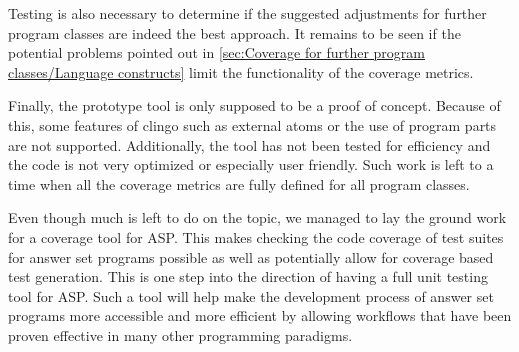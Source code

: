 Testing is also necessary to determine if the suggested adjustments for further program classes are indeed the best approach. It remains to be seen if the potential problems pointed out in \cref{sec:Coverage for further program classes/Language constructs} limit the functionality of the coverage metrics.

Finally, the prototype tool is only supposed to be a proof of concept. Because of this, some features of clingo such as external atoms or the use of program parts are not supported. Additionally, the tool has not been tested for efficiency and the code is not very optimized or especially user friendly. Such work is left to a time when all the coverage metrics are fully defined for all program classes.

Even though much is left to do on the topic, we managed to lay the ground work for a coverage tool for ASP. This makes checking the code coverage of test suites for answer set programs possible as well as potentially allow for coverage based test generation. This is one step into the direction of having a full unit testing tool for ASP. Such a tool will help make the development process of answer set programs more accessible and more efficient by allowing workflows that have been proven effective in many other programming paradigms.


